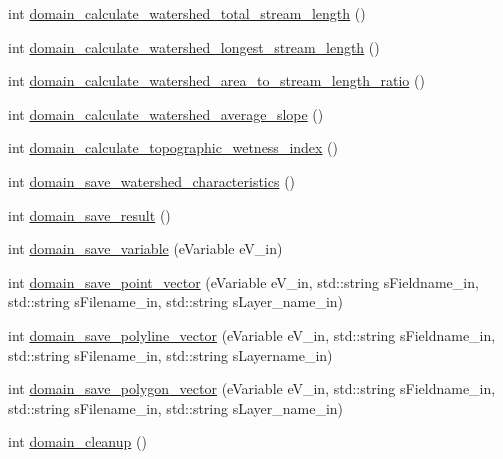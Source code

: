 \begin{DoxyCompactItemize}
\item 
int \hyperlink{classhexwatershed_1_1domain_a4f91911114897b85ecca3ddcc2a6ad3d}{domain\-\_\-calculate\-\_\-watershed\-\_\-total\-\_\-stream\-\_\-length} ()
\item 
int \hyperlink{classhexwatershed_1_1domain_a115ef97c3418382592a2390b766f4a7b}{domain\-\_\-calculate\-\_\-watershed\-\_\-longest\-\_\-stream\-\_\-length} ()
\item 
int \hyperlink{classhexwatershed_1_1domain_affc80ad3c171da254eba12ddf7fc9ad7}{domain\-\_\-calculate\-\_\-watershed\-\_\-area\-\_\-to\-\_\-stream\-\_\-length\-\_\-ratio} ()
\item 
int \hyperlink{classhexwatershed_1_1domain_ac22d45a58ed1063b9a45f3a79893f45e}{domain\-\_\-calculate\-\_\-watershed\-\_\-average\-\_\-slope} ()
\item 
int \hyperlink{classhexwatershed_1_1domain_a81ada0020ec3c991a858a01a72d2c294}{domain\-\_\-calculate\-\_\-topographic\-\_\-wetness\-\_\-index} ()
\item 
int \hyperlink{classhexwatershed_1_1domain_acf500c397baf2a54c510506f4e4a71e6}{domain\-\_\-save\-\_\-watershed\-\_\-characteristics} ()
\item 
int \hyperlink{classhexwatershed_1_1domain_a01b8063b356024ed131bbc98c24f8d87}{domain\-\_\-save\-\_\-result} ()
\item 
int \hyperlink{classhexwatershed_1_1domain_aee3a9cae14f5d4a4a95733888aaceb56}{domain\-\_\-save\-\_\-variable} (e\-Variable e\-V\-\_\-in)
\item 
int \hyperlink{classhexwatershed_1_1domain_a883af7b812dda18a89114cafd62d8666}{domain\-\_\-save\-\_\-point\-\_\-vector} (e\-Variable e\-V\-\_\-in, std\-::string s\-Fieldname\-\_\-in, std\-::string s\-Filename\-\_\-in, std\-::string s\-Layer\-\_\-name\-\_\-in)
\item 
int \hyperlink{classhexwatershed_1_1domain_ad019c4b9bbcb194f1411b4273a561b66}{domain\-\_\-save\-\_\-polyline\-\_\-vector} (e\-Variable e\-V\-\_\-in, std\-::string s\-Fieldname\-\_\-in, std\-::string s\-Filename\-\_\-in, std\-::string s\-Layername\-\_\-in)
\item 
int \hyperlink{classhexwatershed_1_1domain_a4f5a5fc8ad942cea417b505f85749f30}{domain\-\_\-save\-\_\-polygon\-\_\-vector} (e\-Variable e\-V\-\_\-in, std\-::string s\-Fieldname\-\_\-in, std\-::string s\-Filename\-\_\-in, std\-::string s\-Layer\-\_\-name\-\_\-in)
\item 
int \hyperlink{classhexwatershed_1_1domain_a294e571887cc38da0a683ed5abcf41e8}{domain\-\_\-cleanup} ()
\item 

\end{DoxyCompactItemize}
